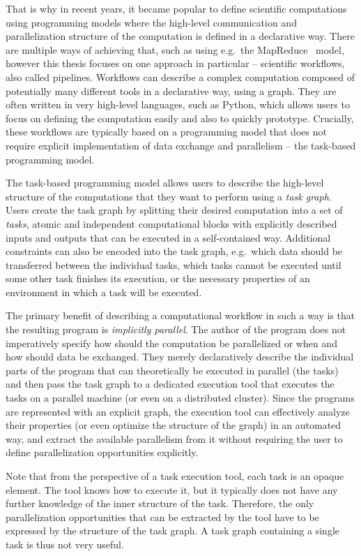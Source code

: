 That is why in recent years, it became popular to define scientific computations using programming
models where the high-level communication and parallelization structure of the computation is
defined in a declarative way. There are multiple ways of achieving that, such as using e.g.\ the
MapReduce~\cite{mapreduce} model, however this thesis focuses on one approach in particular
-- scientific workflows, also called pipelines. Workflows can describe a complex computation
composed of potentially many different tools in a declarative way, using a graph. They are often
written in very high-level languages, such as Python, which allows users to focus on defining the
computation easily and also to quickly prototype. Crucially, these workflows are typically based on
a programming model that does not require explicit implementation of data exchange and parallelism
-- the task-based programming model.

The task-based programming model allows users to describe the high-level structure of the
computations that they want to perform using a \emph{task graph}. Users create the task graph
by splitting their desired computation into a set of \emph{tasks}, atomic and independent
computational blocks with explicitly described inputs and outputs that can be executed in a
self-contained way. Additional constraints can also be encoded into the task graph, e.g.\ which
data should be transferred between the individual tasks, which tasks cannot be executed until some
other task finishes its execution, or the necessary properties of an environment in which a task
will be executed.

The primary benefit of describing a computational workflow in such a way is that the resulting
program is \emph{implicitly parallel}. The author of the program does not imperatively specify how
should the computation be parallelized or when and how should data be exchanged. They merely
declaratively describe the individual parts of the program that can theoretically be executed in
parallel (the tasks) and then pass the task graph to a dedicated execution tool that executes the
tasks on a parallel machine (or even on a distributed cluster). Since the programs are represented
with an explicit graph, the execution tool can effectively analyze their properties (or even
optimize the structure of the graph) in an automated way, and extract the available parallelism
from it without requiring the user to define parallelization opportunities explicitly.

Note that from the perspective of a task execution tool, each task is an opaque element. The tool
knows how to execute it, but it typically does not have any further knowledge of the inner
structure of the task. Therefore, the only parallelization opportunities that can be extracted by
the tool have to be expressed by the structure of the task graph. A task graph containing a single
task is thus not very useful.

